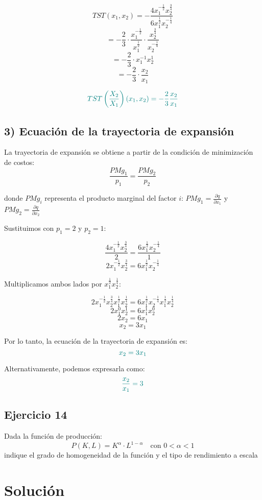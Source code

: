 \documentclass{article}
\begin{document}
\[
TST(x_1,x_2) = -\frac{4x_1^{-\frac{1}{2}}x_2^{\frac{3}{4}}}{6x_1^{\frac{1}{2}}x_2^{-\frac{1}{4}}}
\]
\[
= -\frac{2}{3} \cdot \frac{x_1^{-\frac{1}{2}}}{x_1^{\frac{1}{2}}} \cdot \frac{x_2^{\frac{3}{4}}}{x_2^{-\frac{1}{4}}}
\]
\[
= -\frac{2}{3} \cdot x_1^{-1} x_2^{1}
\]
\[
= -\frac{2}{3} \cdot \frac{x_2}{x_1}
\]

\[
\color{teal}
TST\left(\frac{X_2}{X_1}\right)(x_1,x_2) = -\frac{2}{3}\frac{x_2}{x_1}
\]
\subsection*{3) Ecuación de la trayectoria de expansión}

La trayectoria de expansión se obtiene a partir de la condición de minimización de costos:
\[
\frac{PMg_1}{p_1} = \frac{PMg_2}{p_2}
\]

donde \(PMg_i\) representa el producto marginal del factor \(i\):
\(PMg_1 = \frac{\partial q}{\partial x_1}\) y \(PMg_2 = \frac{\partial q}{\partial x_2}\)

Sustituimos con \(p_1 = 2\) y \(p_2 = 1\):

\[
\frac{4x_1^{-\frac{1}{2}}x_2^{\frac{3}{4}}}{2} = \frac{6x_1^{\frac{1}{2}}x_2^{-\frac{1}{4}}}{1}
\]
\[
2x_1^{-\frac{1}{2}}x_2^{\frac{3}{4}} = 6x_1^{\frac{1}{2}}x_2^{-\frac{1}{4}}
\]

Multiplicamos ambos lados por \(x_1^{\frac{1}{2}}x_2^{\frac{1}{4}}\):

\[
2x_1^{-\frac{1}{2}}x_2^{\frac{3}{4}}x_1^{\frac{1}{2}}x_2^{\frac{1}{4}} = 6x_1^{\frac{1}{2}}x_2^{-\frac{1}{4}}x_1^{\frac{1}{2}}x_2^{\frac{1}{4}}
\]
\[
2x_1^{0}x_2^{1} = 6x_1^{1}x_2^{0}
\]
\[
2x_2 = 6x_1
\]
\[
x_2 = 3x_1
\]

Por lo tanto, la ecuación de la trayectoria de expansión es:
\[
\color{teal}
x_2 = 3x_1
\]

Alternativamente, podemos expresarla como:
\[
\color{teal}
\frac{x_2}{x_1} = 3
\]

\newpage
\subsection{Ejercicio 14}
Dada la función de producción:
\[
P(K, L) = K^{\alpha} \cdot L^{1 - \alpha} 
\quad \text{con } 0 < \alpha < 1
\]
indique el grado de homogeneidad de la función y el tipo de rendimiento a escala

\newpage
\section*{Solución}
\end{document}
